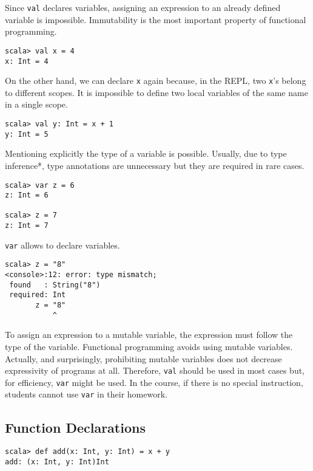 Since \verb+val+ declares  variables, assigning an expression to an
already defined variable is impossible. Immutability is the most important
property of functional programming.

\begin{verbatim}
scala> val x = 4
x: Int = 4
\end{verbatim}

On the other hand, we can declare \verb+x+ again because, in the REPL, two \verb+x+'s
belong to different scopes. It is impossible to define two local variables of
the same name in a single scope.

\begin{verbatim}
scala> val y: Int = x + 1
y: Int = 5
\end{verbatim}

Mentioning explicitly the type of a variable is possible. Usually, due to
type inference*, type annotations are unnecessary but they are required in rare cases.

\begin{verbatim}
scala> var z = 6
z: Int = 6

scala> z = 7
z: Int = 7
\end{verbatim}

\verb+var+ allows to declare  variables.

\begin{verbatim}
scala> z = "8"
<console>:12: error: type mismatch;
 found   : String("8")
 required: Int
       z = "8"
           ^
\end{verbatim}

To assign an expression to a mutable variable, the expression must follow the
type of the variable. Functional programming avoids using mutable variables.
Actually, and surprisingly, prohibiting mutable variables does not decrease
expressivity of programs at all. Therefore, \verb+val+ should be used in most cases
but, for efficiency, \verb+var+ might be used. In the course, if there is no
special instruction, students cannot use \verb+var+ in their homework.

\subsection{Function Declarations}

\begin{verbatim}
scala> def add(x: Int, y: Int) = x + y
add: (x: Int, y: Int)Int
\end{verbatim}

